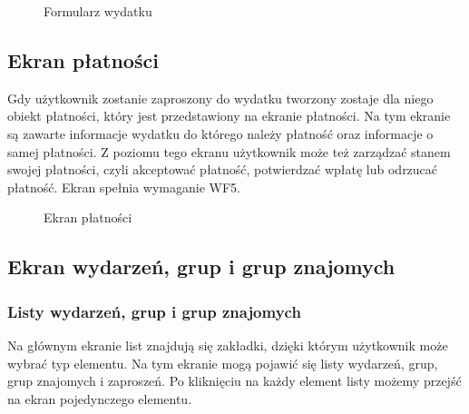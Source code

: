 \begin{figure}[h!]%
    \centering
    \qquad
    \qquad
    \caption{Formularz wydatku}%
\end{figure}

\clearpage
\subsection{Ekran płatności}
Gdy użytkownik zostanie zaproszony do wydatku tworzony zostaje dla niego obiekt płatności, który jest przedstawiony na ekranie płatności. Na tym ekranie są zawarte informacje wydatku do którego należy płatność oraz informacje o samej płatności. Z poziomu tego ekranu użytkownik może też zarządzać stanem swojej płatności, czyli akceptować płatność, potwierdzać wpłatę lub odrzucać płatność. Ekran spełnia wymaganie WF5.

\begin{figure}[h!]%
    \centering
    \qquad
    \qquad
    \qquad
    \caption{Ekran płatności}%
\end{figure}

\clearpage
\subsection{Ekran wydarzeń, grup i grup znajomych}
\subsubsection{Listy wydarzeń, grup i grup znajomych}
Na głównym ekranie list znajdują się zakładki, dzięki którym użytkownik może wybrać typ elementu. Na tym ekranie mogą pojawić się listy wydarzeń, grup, grup znajomych i zaproszeń. Po kliknięciu na każdy element listy możemy przejść na ekran pojedynczego elementu.

